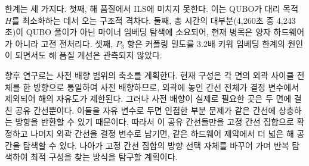 \documentclass[twocolumn,a4paper]{article}
\begin{document}
한계는 세 가지다. 첫째, 해 품질에서 ILS에 미치지 못한다. 이는 QUBO가 대리 목적 \(H\)를 최소화하는 데서 오는 구조적 격차다. 둘째, 총 시간의 대부분(4{,}260초 중 4{,}243초)이 QUBO 풀이가 아닌 마이너 임베딩 탐색에 소요되어, 현재 병목은 양자 하드웨어가 아니라 고전 전처리다. 셋째, \(P_3\) 항은 커플링 밀도를 3.2배 키워 임베딩 한계의 원인이 되면서도 해 품질 개선은 관측되지 않았다.

향후 연구로는 사전 배향 범위의 축소를 계획한다. 현재 구성은 각 면의 외곽 사이클 전체를 한 방향으로 통일하여 사전 배향하므로, 외곽에 놓인 간선 전체가 결정 변수에서 제외되어 해의 자유도가 제한된다. 그러나 사전 배향이 실제로 필요한 곳은 두 면에 걸친 공유 간선뿐이다. 이들을 자유 변수로 두면 인접한 부분 문제가 같은 간선에 상충하는 방향을 반환할 수 있기 때문이다. 따라서 이 공유 간선들만을 고정 간선 집합으로 확정하고 나머지 외곽 간선을 결정 변수로 남기면, 같은 하드웨어 제약에서 더 넓은 해 공간을 탐색할 수 있다. 나아가 고정 간선 집합의 방향 선택 자체를 바꾸어 가며 반복 탐색하여 최적 구성을 찾는 방식을 탐구할 계획이다.



\end{document}
